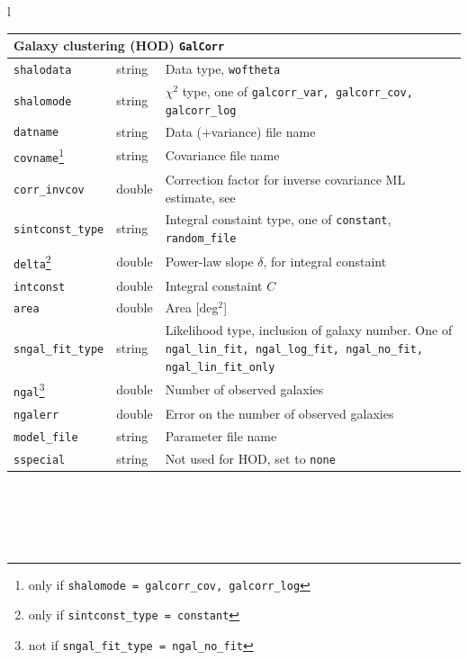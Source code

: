 \documentclass[11pt, chapterprefix, headsepline]{scrartcl}
\newcommand{\onlyif}[2]{\footnote{only if \texttt{#1 =\; #2}}}
\newcommand{\notif}[2]{\footnote{not if \texttt{#1 =\; #2}}}
\newcommand{\mythemp}{$^{\renewcommand{\thempfootnote}{\alph{mpfootnote}}\thempfootnote}$}
\begin{document}
\begin{longtable}{l}
\begin{minipage}{\textwidth}
 \begin{tabularx}{\textwidth}{llX}
  \hline \multicolumn{3}{l}{\rul Galaxy clustering (HOD) \quad \texttt{GalCorr}} \\ \hline
    \texttt{shalodata} & string & Data type, \texttt{woftheta} \\
    \texttt{shalomode} & string & $\chi^2$ type, one of
    \texttt{galcorr\_var, galcorr\_cov, galcorr\_log} \\
    \texttt{datname}   & string & Data (+variance) file name \\
    \texttt{covname}\onlyif{shalomode}{galcorr\_cov, galcorr\_log}   & string & Covariance file name \\
    \texttt{corr\_invcov}\mythemp & double & Correction factor for inverse
    covariance ML estimate, see \cite{HSS07} \\
    \texttt{sintconst\_type} & string & Integral constaint type, one of \texttt{constant}, \texttt{random\_file} \\
    \texttt{delta}\onlyif{sintconst\_type}{constant}  & double & Power-law slope $\delta$, for integral constaint\\
    \texttt{intconst} & double & Integral constaint $C$ \\
    \texttt{area}    & double & Area [deg$^2$] \\
    \texttt{sngal\_fit\_type} & string & Likelihood type, inclusion of
    galaxy number. One of
    \texttt{ngal\_lin\_fit, ngal\_log\_fit, ngal\_no\_fit, ngal\_lin\_fit\_only} \\
    \texttt{ngal}\notif{sngal\_fit\_type}{ngal\_no\_fit} & double & Number of observed galaxies \\
    \texttt{ngalerr}\mythemp & double & Error on the number of
    observed galaxies \\ 
    \texttt{model\_file}   & string & Parameter file name \\
    \texttt{sspecial}   & string & Not used for HOD, set to \texttt{none} \\
    \hline
\end{tabularx}
\\
\end{minipage}
\\ \\
% 


\end{longtable}
\end{document}
